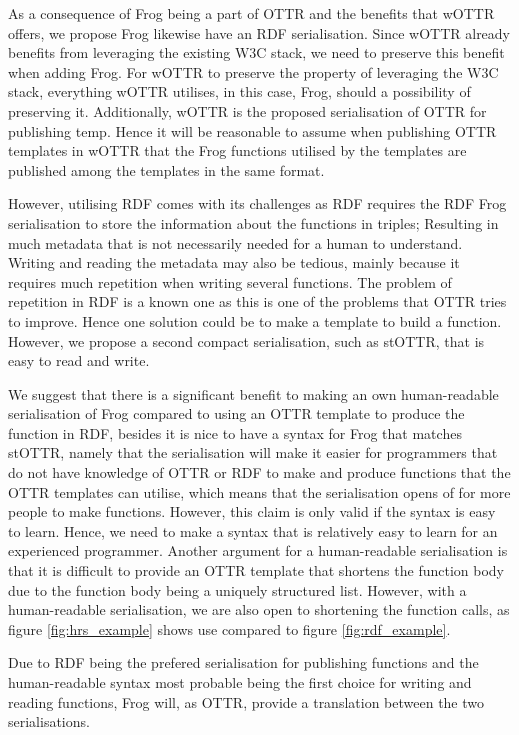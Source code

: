 \para
As a consequence of Frog being a part of OTTR and the benefits that wOTTR offers, we propose Frog likewise have an RDF serialisation. Since wOTTR already benefits from leveraging the existing W3C stack, we need to preserve this benefit when adding Frog. For wOTTR to preserve the property of leveraging the W3C stack, everything wOTTR utilises, in this case, Frog, should a possibility of preserving it.  Additionally, wOTTR is the proposed serialisation of OTTR for publishing temp. Hence it will be reasonable to assume when publishing OTTR templates in wOTTR that the Frog functions utilised by the templates are published among the templates in the same format.  

\para
However, utilising RDF comes with its challenges as RDF requires the RDF Frog serialisation to store the information about the functions in triples; Resulting in much metadata that is not necessarily needed for a human to understand. Writing and reading the metadata may also be tedious, mainly because it requires much repetition when writing several functions. The problem of repetition in RDF is a known one as this is one of the problems that OTTR tries to improve. Hence one solution could be to make a template to build a function. However, we propose a second compact serialisation, such as stOTTR, that is easy to read and write. 

\para
We suggest that there is a significant benefit to making an own human-readable serialisation of Frog compared to using an OTTR template to produce the function in RDF, besides it is nice to have a syntax for Frog that matches stOTTR, namely that the serialisation will make it easier for programmers that do not have knowledge of OTTR or RDF to make and produce functions that the OTTR templates can utilise, which means that the serialisation opens of for more people to make functions. However, this claim is only valid if the syntax is easy to learn. Hence, we need to make a syntax that is relatively easy to learn for an experienced programmer. Another argument for a human-readable serialisation is that it is difficult to provide an OTTR template that shortens the function body due to the function body being a uniquely structured list. However, with a human-readable serialisation, we are also open to shortening the function calls, as figure \ref{fig:hrs_example} shows use compared to figure \ref{fig:rdf_example}. 

\para
Due to RDF being the prefered serialisation for publishing functions and the human-readable syntax most probable being the first choice for writing and reading functions, Frog will, as OTTR, provide a translation between the two serialisations. 

